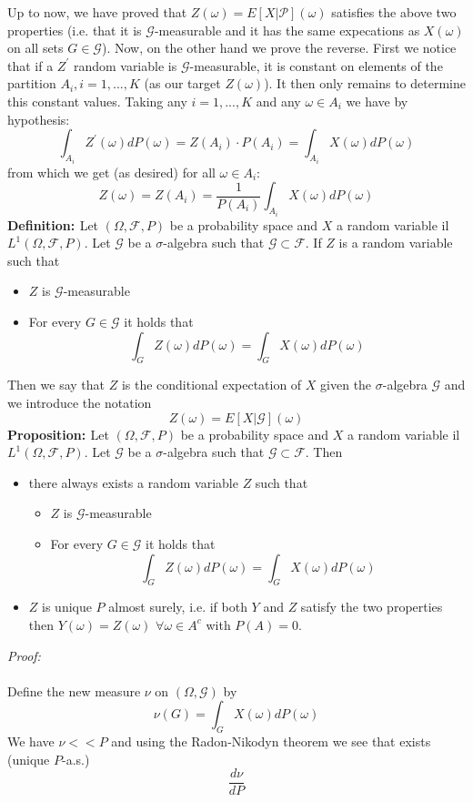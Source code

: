 \documentclass[a4paper,10pt]{report}
\theoremstyle{plain}
\theoremstyle{definition}
\newcommand{\DEF} {{\bf{Definition: }}}
\newcommand{\PROP} {{\bf{Proposition: }}}
\newcommand{\PROOF} {{\emph{Proof: \\ \\}}}
\newcommand{\SA} {{$\sigma$-algebra} }
\newcommand{\FF} {\mathcal{F} }
\begin{document}
Up to now, we have proved that $Z(\omega)=E[X|\mathcal{P}](\omega)$  satisfies the above two properties (i.e. that it is $\mathcal{G}$-measurable and it has the same expecations as $X(\omega)$ on all sets $G\in \mathcal{G}$). Now, on the other hand we prove the reverse. First we notice that if a $Z^{'}$ random variable is $\mathcal{G}$-measurable, it is constant on elements of the partition $A_i, i=1,...,K$ (as our target $Z(\omega)$). It then only remains to determine this constant values. Taking any $i=1,...,K$ and any $\omega\in A_i$ we have by hypothesis:
\[
\int_{A_i}Z^{'}(\omega)dP(\omega)=Z(A_i)\cdot P(A_i)=\int_{A_i} X(\omega) dP(\omega)
\]
from which we get (as desired) for all $\omega\in A_i$:
\[
Z(\omega)=Z(A_i)=\frac{1}{P(A_i)}\int_{A_i} X(\omega) dP(\omega)
\]
\DEF Let $(\Omega,\FF,P)$ be a probability space and $X$ a random variable il $L^1(\Omega,\FF,P)$. Let $\mathcal{G}$ be a \SA such that $\mathcal{G}\subset \FF$. If $Z$ is a random variable such that
\begin{itemize}
\item $Z$ is $\mathcal{G}$-measurable
\item For every $G\in \mathcal{G}$ it holds that 
\[
\int_G Z(\omega)dP(\omega) = \int_G X(\omega) dP(\omega)
\]
\end{itemize}
Then we say that $Z$ is the conditional expectation of $X$ given the \SA $\mathcal{G}$ and we introduce the notation
\[
Z(\omega)=E[X|\mathcal{G}](\omega)
\]
\PROP Let $(\Omega,\FF,P)$ be a probability space and $X$ a random variable il $L^1(\Omega,\FF,P)$. Let $\mathcal{G}$ be a \SA such that $\mathcal{G}\subset \FF$. Then
\begin{itemize}
\item there always exists a random variable $Z$ such that
\begin{itemize}
\item $Z$ is $\mathcal{G}$-measurable
\item For every $G\in \mathcal{G}$ it holds that 
\[
\int_G Z(\omega)dP(\omega) = \int_G X(\omega) dP(\omega)
\]
\end{itemize}
\item $Z$ is unique $P$ almost surely, i.e. if both $Y$ and $Z$ satisfy the two properties then $Y(\omega)=Z(\omega)$ $\forall\omega\in A^c$ with $P(A)=0$.
\end{itemize}
\PROOF
Define the new measure $\nu$ on $(\Omega, \mathcal{G})$ by
\[
\nu(G)=\int_G X(\omega) dP(\omega)
\]
We have $\nu << P$ and using the Radon-Nikodyn theorem we see that exists (unique $P$-a.s.)
\[
\frac{d\nu}{dP}
\]
\end{document}
